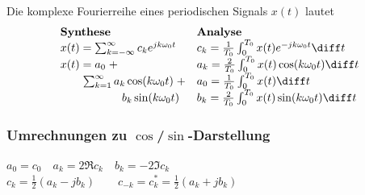 \begin{emphbox}
    Die komplexe Fourierreihe eines periodischen Signals $x(t)$ lautet
    \begin{equation*}
        \begin{array}{@{}ll@{}}
            \textbf{Synthese}                                 & \textbf{Analyse}                                           \\
            x(t)=\sum_{k=-\infty}^{\infty}c_ke^{jk\omega_0 t} & c_k=\frac{1}{T_0}\int_0^{T_0}x(t)e^{-jk\omega_0 t}\diff t  \\
            x(t) = a_0 \; +                                   & a_k = \frac{2}{T_0}\int_0^{T_0}x(t)\cos(k\omega_0t)\diff t \\
            \qquad \sum_{k=1}^\infty a_k\cos(k\omega_0t) \; + & a_0 = \frac{1}{T_0}\int_0^{T_0}x(t)\diff t                 \\
            \qquad\qquad\quad \;\, b_k\sin(k\omega_0 t)       & b_k = \frac{2}{T_0}\int_0^{T_0}x(t)\sin(k\omega_0t)\diff t
        \end{array}
    \end{equation*}
\end{emphbox}

\begin{sectionbox}
    \subsubsection{Umrechnungen zu $\cos$/$\sin$-Darstellung}
    $a_0=c_0 \quad a_k=2\Re{c_k} \quad b_k=-2\Im{c_k}$ \\
    $c_k=\frac{1}{2}(a_k-jb_k) \qquad c_{-k} = c_k^*=\frac{1}{2}(a_k+jb_k)$
\end{sectionbox}


